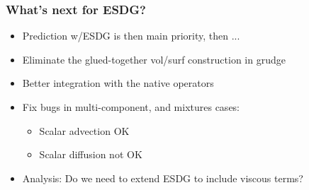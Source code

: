 \begin{frame}\frametitle{What's next for ESDG?}
\begin{itemize}
\item Prediction w/ESDG is then main priority, then ...
\item Eliminate the glued-together vol/surf construction in grudge
\item Better integration with the native operators
\item Fix bugs in multi-component, and mixtures cases:
\begin{itemize}
\item Scalar advection OK
\item Scalar diffusion not OK
\end{itemize}
\item Analysis: Do we need to extend ESDG to include viscous terms?
\end{itemize}
\end{frame}

